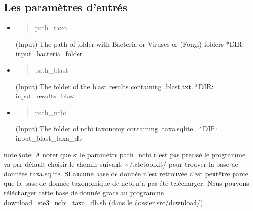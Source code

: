 \documentclass[letterpaper,10pt,french]{sphinxmanual}
\begin{document}
\subsection{Les paramètres d’entrés}
\label{\detokenize{bash/find_same_id_kraken_blast_bacteria.sh:les-parametres-d-entres}}\begin{itemize}
\item {} \begin{quote}\begin{description}
\item[{\sphinxhyphen{}path\_taxo}] \leavevmode
\end{description}\end{quote}

(Input)  The path of folder with Bacteria or Viruses or (Fongi) folders          *DIR: input\_bacteria\_folder

\item {} \begin{quote}\begin{description}
\item[{\sphinxhyphen{}path\_blast}] \leavevmode
\end{description}\end{quote}

(Input)  The folder of the blast results containing .blast.txt.                  *DIR: input\_results\_blast

\item {} \begin{quote}\begin{description}
\item[{\sphinxhyphen{}path\_ncbi}] \leavevmode
\end{description}\end{quote}

(Input)  The folder of ncbi taxonomy containing .taxa.sqlite .                   *DIR: input\_blast\_taxa\_db

\end{itemize}

\begin{sphinxadmonition}{note}{Note:}
A noter que si le paramètre \sphinxhyphen{}path\_ncbi n’est pas précisé le programme va par défault choisir le chemin suivant: \textasciitilde{}/.etetoolkit/ pour trouver la base de données taxa.sqlite. Si aucune base de donnée n’est retrouvée c’est peut\sphinxhyphen{}être parce que la base de donnée taxonomique de ncbi n’a pas été télécharger. Nous pouvons télécharger cette base de donnée grace au programme download\_ete3\_ncbi\_taxa\_db.sh (dans le dossier src/download/).
\end{sphinxadmonition}
\end{document}

